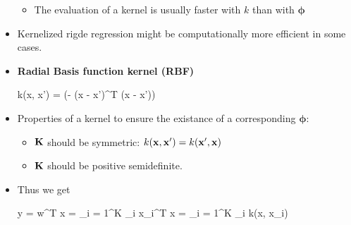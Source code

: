 \begin{itemize}
\begin{itemize}
		\item The evaluation of a kernel is usually faster with $k$ than with $\bm \phi$
	\end{itemize}
	\item Kernelized rigde regression might be computationally more efficient in some cases.
	\item \textbf{Radial Basis function kernel (RBF)}
	\begin{myalign*}
	     k(\*x, \*x') = \exp(- (\*x - \*x')^T (\*x - \*x'))
	 \end{myalign*} 
	\item Properties of a kernel to ensure the existance of a corresponding $\bm \phi$:
	\begin{itemize}
		\item $\mathbf{K}$ should be symmetric: $k(\mathbf{x}, \mathbf{x}') = k(\mathbf{x}', \mathbf{x})$
		\item $\mathbf{K}$ should be positive semidefinite.
	\end{itemize}
	\item Thus we get
	\begin{myalign*}
	    \*y = \bm w^T \*x = \sum_{i = 1}^K \alpha_i \*x_i^T \*x = \sum_{i = 1}^K \alpha_i k(\*x, \*x_i) 
	\end{myalign*}
\end{itemize}


